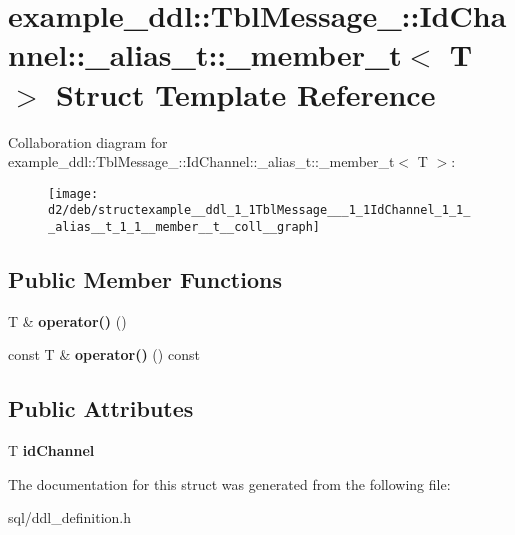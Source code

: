 \hypertarget{structexample__ddl_1_1TblMessage___1_1IdChannel_1_1__alias__t_1_1__member__t}{}\section{example\+\_\+ddl\+:\+:Tbl\+Message\+\_\+\+:\+:Id\+Channel\+:\+:\+\_\+alias\+\_\+t\+:\+:\+\_\+member\+\_\+t$<$ T $>$ Struct Template Reference}
\label{structexample__ddl_1_1TblMessage___1_1IdChannel_1_1__alias__t_1_1__member__t}


Collaboration diagram for example\+\_\+ddl\+:\+:Tbl\+Message\+\_\+\+:\+:Id\+Channel\+:\+:\+\_\+alias\+\_\+t\+:\+:\+\_\+member\+\_\+t$<$ T $>$\+:
\nopagebreak
\begin{figure}[H]
\begin{center}
\leavevmode
\texttt{[image: d2/deb/structexample\_\_ddl\_1\_1TblMessage\_\_\_1\_1IdChannel\_1\_1\_\_alias\_\_t\_1\_1\_\_member\_\_t\_\_coll\_\_graph]}
\end{center}
\end{figure}
\subsection*{Public Member Functions}
\begin{DoxyCompactItemize}
\item 
\hypertarget{structexample__ddl_1_1TblMessage___1_1IdChannel_1_1__alias__t_1_1__member__t_aa1f411aa99eb61d20f131aff212af0cc}{}T \& {\bfseries operator()} ()\label{structexample__ddl_1_1TblMessage___1_1IdChannel_1_1__alias__t_1_1__member__t_aa1f411aa99eb61d20f131aff212af0cc}

\item 
\hypertarget{structexample__ddl_1_1TblMessage___1_1IdChannel_1_1__alias__t_1_1__member__t_a82b22c9b5b6f983420cce7fc0ec12c18}{}const T \& {\bfseries operator()} () const \label{structexample__ddl_1_1TblMessage___1_1IdChannel_1_1__alias__t_1_1__member__t_a82b22c9b5b6f983420cce7fc0ec12c18}

\end{DoxyCompactItemize}
\subsection*{Public Attributes}
\begin{DoxyCompactItemize}
\item 
\hypertarget{structexample__ddl_1_1TblMessage___1_1IdChannel_1_1__alias__t_1_1__member__t_a033ca174555366c7662e90b325c63880}{}T {\bfseries id\+Channel}\label{structexample__ddl_1_1TblMessage___1_1IdChannel_1_1__alias__t_1_1__member__t_a033ca174555366c7662e90b325c63880}

\end{DoxyCompactItemize}


The documentation for this struct was generated from the following file\+:\begin{DoxyCompactItemize}
\item 
sql/ddl\+\_\+definition.\+h\end{DoxyCompactItemize}
